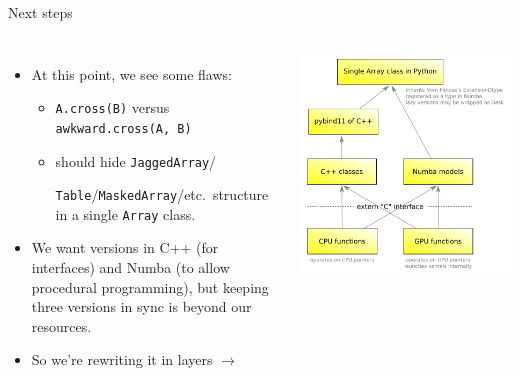 \documentclass[aspectratio=169]{beamer}
\begin{document}
\begin{frame}{Next steps}
\large
\vspace{0.5 cm}
\begin{columns}
\begin{itemize}\setlength{\itemsep}{0.25 cm}
\item At this point, we see some flaws:
\begin{itemize}\setlength{\itemsep}{0.25 cm}
\item \texttt{A.cross(B)} versus \texttt{awkward.cross(A, B)}
\item should hide \texttt{JaggedArray}/

\texttt{Table}/\texttt{MaskedArray}/etc.\ structure in a single \texttt{Array} class.
\end{itemize}

\item We want versions in C++ (for interfaces) and Numba (to allow procedural programming), but keeping three versions in sync is beyond our resources.

\item So we're rewriting it in layers \hfill$\longrightarrow$

\vspace{0.5 cm}
\end{itemize}

\includegraphics[width=\linewidth]{awkward-1-0-layers.pdf}
\end{columns}
\end{frame}
\end{document}
